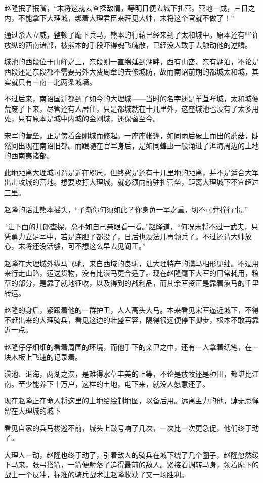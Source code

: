 赵隆抿了抿嘴，“末将这就去查探敌情，等明日便去城下扎营。营地一成，三日之内，不能拿下大理城，绑着大理君臣来拜见大帅，末将这个官就不做了！”

通过杀人立威，整顿了麾下兵马，熊本的行辕已经来到了太和城中。原本还有些许放纵的西南诸部，被熊本的手段吓得魂飞魄散，已经没人敢于去触动他的逆鳞。

城池的西段位于山峰之上，东段则一直绵延到湖畔，西有山峦、东有湖泊，不论是西段还是东段都不需要另外大费周章的去修城防，故而南诏前期的都城太和城，其实就只有一南一北两条城墙。

不过后来，南诏国迁都到了如今的大理城——当时的名字还是羊苴咩城，太和城便荒废了下来，尽管还有人居住，只是都城就在十几里外，这座城池也没有了太多用处，只有原本是城中内城的金刚城，还保留至今。

宋军的营垒，正是傍着金刚城而修起。一座座帐篷，如同雨后破土而出的蘑菇，陡然间出现在南诏旧都。而跟随在官军身后，是如同蝗虫一般涌进了洱海周边的土地的西南夷诸部。

此地距离大理城可谓是近在咫尺，但终究是还有十几里地的距离，并不是适合大军出击攻城的营地。想要攻打大理城，就必须向前驻扎营垒，距离大理城下不宜超过三里。

赵隆的话让熊本摇头，“子渐你何须如此？你身负一军之重，切不可莽撞行事。”

“让下面的儿郎查探，总不如自己亲眼看一看。”赵隆道，“何况末将不过一武夫，只凭勇力立足军中，若是连胆子都没了，日后也没法儿再领兵了。不过还请大帅放心，末将还没活够，可不想这么早去见阎王。”

赵隆在大理城外纵马飞驰，来自西域的良驹，让大理特产的滇马相形见绌。不过用来行走山路，运送货物，没有比滇马更合适了。现在赵隆麾下大军的日常耗用，粮草的部分，是靠了就地征收，以及得到的战利品，而其余军资正是靠着滇马的千里转运。

赵隆的身后，紧跟着他的一群护卫，人人高头大马。本来看见宋军逼近城下，不得不赶出来的大理骑兵，看见这边的壮盛军容，隔得很远便停下脚步，根本不敢再靠近一点。

赵隆仔仔细细的看着周围的环境，而他手下的亲卫之中，还有一人拿着纸笔，在一块木板上飞速的记录着。

滇池、洱海，两湖之滨，是难得水草丰美的上等，不论是放牧还是种田，都堪比江南。至少能养下十万户，这样的土地，屯下来，就没人愿意还了。

现在赵隆正在命人将这里的土地给绘制地图，以备后用。远离主力的他，肆无忌惮留在大理城的城下

看见自家的兵马梭巡不前，城头上鼓号响了几次，一次比一次更急促，他们终于动了。

大理人一动，赵隆也终于动了，引着敌人的骑兵在城下绕了几个圈子，赵隆忽然缓下马来，张弓搭箭，一箭便射落了追得最前的敌人。紧接着调转马身，领着麾下的战士一个反冲，标准的骑兵战术让赵隆收获了又一场胜利。

